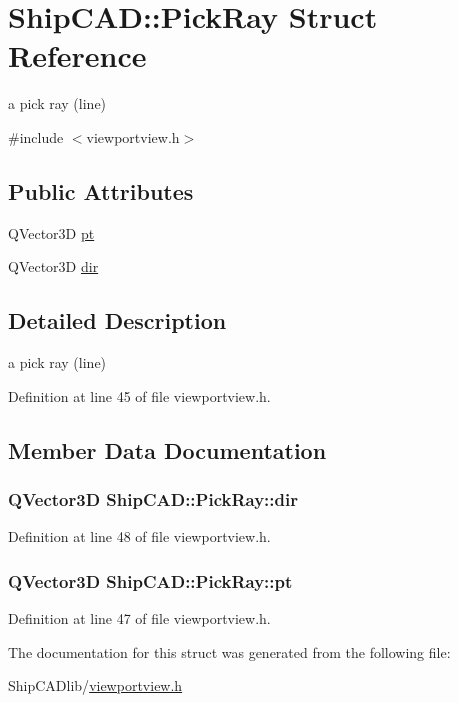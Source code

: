 \hypertarget{structShipCAD_1_1PickRay}{\section{Ship\-C\-A\-D\-:\-:Pick\-Ray Struct Reference}
\label{structShipCAD_1_1PickRay}
}


a pick ray (line)  




{\ttfamily \#include $<$viewportview.\-h$>$}

\subsection*{Public Attributes}
\begin{DoxyCompactItemize}
\item 
Q\-Vector3\-D \hyperlink{structShipCAD_1_1PickRay_a2a9ed44a643481ceefcdec276ce7425a}{pt}
\item 
Q\-Vector3\-D \hyperlink{structShipCAD_1_1PickRay_a9e277629b120f405d2780f1235e8dcb1}{dir}
\end{DoxyCompactItemize}


\subsection{Detailed Description}
a pick ray (line) 

Definition at line 45 of file viewportview.\-h.



\subsection{Member Data Documentation}
\hypertarget{structShipCAD_1_1PickRay_a9e277629b120f405d2780f1235e8dcb1}{
\subsubsection[{dir}]{\setlength{\rightskip}{0pt plus 5cm}Q\-Vector3\-D Ship\-C\-A\-D\-::\-Pick\-Ray\-::dir}}\label{structShipCAD_1_1PickRay_a9e277629b120f405d2780f1235e8dcb1}


Definition at line 48 of file viewportview.\-h.

\hypertarget{structShipCAD_1_1PickRay_a2a9ed44a643481ceefcdec276ce7425a}{
\subsubsection[{pt}]{\setlength{\rightskip}{0pt plus 5cm}Q\-Vector3\-D Ship\-C\-A\-D\-::\-Pick\-Ray\-::pt}}\label{structShipCAD_1_1PickRay_a2a9ed44a643481ceefcdec276ce7425a}


Definition at line 47 of file viewportview.\-h.



The documentation for this struct was generated from the following file\-:\begin{DoxyCompactItemize}
\item 
Ship\-C\-A\-Dlib/\hyperlink{viewportview_8h}{viewportview.\-h}\end{DoxyCompactItemize}
